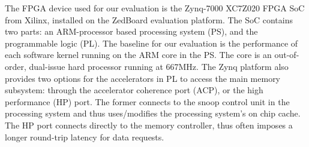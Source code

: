 \documentclass{sig-alternate}
\begin{document}
The FPGA device used for our evaluation is the Zynq-7000 XC7Z020 FPGA
SoC from Xilinx, installed on the ZedBoard evaluation platform. The SoC contains two parts: an ARM-processor based processing
system (PS), and the programmable logic (PL). 
The baseline for our evaluation is the performance of each software kernel running
on the ARM core in the PS. 
The core is an out-of-order, dual-issue hard
processor running at 667MHz. The Zynq platform also provides two
options for the accelerators in PL to access the main memory subsystem: 
through the accelerator coherence port (ACP), or the high performance (HP) port. 
The former connects to the snoop control unit in the processing system and 
thus uses/modifies the processing system's on chip cache. The HP port connects
directly to the memory controller, thus often imposes a longer round-trip latency
for data requests.

\end{document}
